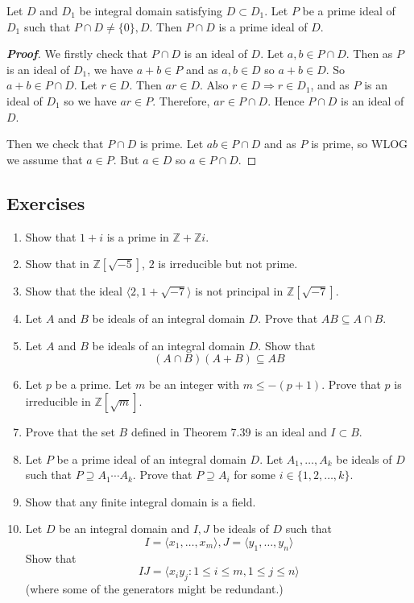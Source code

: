 \begin{theorem} Let $D$ and $D_1$ be integral domain satisfying $D \subset D_1$. Let $P$ be a prime ideal of $D_1$ such that $P \cap D \neq \{0\},D$. Then $P \cap D$ is a prime ideal of $D$.
\end{theorem}
\begin{proof}[\bf Proof] We firstly check that $P \cap D$ is an ideal of $D$. Let $a,b \in P \cap D$. Then
as $P$ is an ideal of $D_1$, we have $a+b \in P$ and as $a,b \in D$ so $a+b \in D$. So $a+b \in P \cap D$.
Let $r \in D$. Then $ar \in D$. Also $r \in D \Rightarrow r \in D_1$, and as $P$ is an ideal of $D_1$ so we have $ar \in P$. Therefore, $ar \in P \cap D$. Hence $P \cap D$ is an ideal of $D$.

Then we check that $P \cap D$ is prime. Let $ab \in P \cap D$ and as $P$ is prime, so WLOG we assume that $a \in P$. But $a \in D$ so $a \in P \cap D$.
\end{proof}
\subsection{Exercises}
\begin{enumerate}
\item Show that $1+i$ is a prime in $\mathbb{Z}+\mathbb{Z}i$.
\item Show that in $\mathbb{Z}[\sqrt{-5}]$, $2$ is irreducible but not prime.
\item Show that the ideal $\langle 2,1+\sqrt{-7} \rangle$ is not principal in $\mathbb{Z}[\sqrt{-7}]$.
\item Let $A$ and $B$ be ideals of an integral domain $D$. Prove that $AB \subseteq A \cap B$.
\item Let $A$ and $B$ be ideals of an integral domain $D$. Show that
$$(A \cap B)(A+B) \subseteq AB$$
\item Let $p$ be a prime. Let $m$ be an integer with $m \le -(p+1)$. Prove that $p$ is irreducible in $\mathbb{Z}[\sqrt{m}]$.
\item Prove that the set $B$ defined in Theorem 7.39 is an ideal and $I \subset B$.
\item Let $P$ be a prime ideal of an integral domain $D$. Let $A_1,\ldots,A_k$ be ideals of $D$ such that $P \supseteq A_1\cdots A_k$. Prove that $P \supseteq A_i$ for some $i \in \{1,2,\ldots,k\}$.
\item Show that any finite integral domain is a field.
\item Let $D$ be an integral domain and $I, J$ be ideals of $D$ such that
$$I=\langle x_1,\ldots,x_m \rangle, J=\langle y_1,\ldots,y_n \rangle$$
Show that
$$IJ=\langle x_i y_j: 1 \le i \le m, 1 \le j \le n \rangle$$
(where some of the generators might be redundant.)
\end{enumerate}





